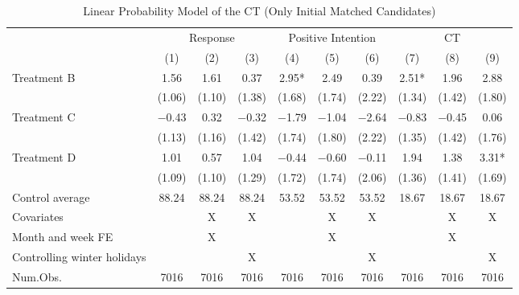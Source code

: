 \documentclass[12pt, a4paper]{article}
\begin{document}
\begin{table}[H]

\caption{\label{tab:lm-reply-test-initial-matched}Linear Probability Model of the CT (Only Initial Matched Candidates)}
\centering
\fontsize{8}{10}\selectfont
\begin{threeparttable}
\begin{tabular}[t]{lccccccccc}
\toprule
\multicolumn{1}{c}{ } & \multicolumn{3}{c}{Response} & \multicolumn{3}{c}{Positive Intention} & \multicolumn{3}{c}{CT} \\
\cmidrule(l{3pt}r{3pt}){2-4} \cmidrule(l{3pt}r{3pt}){5-7} \cmidrule(l{3pt}r{3pt}){8-10}
  & (1) & (2) & (3) & (4) & (5) & (6) & (7) & (8) & (9)\\
\midrule
Treatment B & \num{1.56} & \num{1.61} & \num{0.37} & \num{2.95}* & \num{2.49} & \num{0.39} & \num{2.51}* & \num{1.96} & \num{2.88}\\
 & (\num{1.06}) & (\num{1.10}) & (\num{1.38}) & (\num{1.68}) & (\num{1.74}) & (\num{2.22}) & (\num{1.34}) & (\num{1.42}) & (\num{1.80})\\
Treatment C & \num{-0.43} & \num{0.32} & \num{-0.32} & \num{-1.79} & \num{-1.04} & \num{-2.64} & \num{-0.83} & \num{-0.45} & \num{0.06}\\
 & (\num{1.13}) & (\num{1.16}) & (\num{1.42}) & (\num{1.74}) & (\num{1.80}) & (\num{2.22}) & (\num{1.35}) & (\num{1.42}) & (\num{1.76})\\
Treatment D & \num{1.01} & \num{0.57} & \num{1.04} & \num{-0.44} & \num{-0.60} & \num{-0.11} & \num{1.94} & \num{1.38} & \num{3.31}*\\
 & (\num{1.09}) & (\num{1.10}) & (\num{1.29}) & (\num{1.72}) & (\num{1.74}) & (\num{2.06}) & (\num{1.36}) & (\num{1.41}) & (\num{1.69})\\
\midrule
Control average & 88.24 & 88.24 & 88.24 & 53.52 & 53.52 & 53.52 & 18.67 & 18.67 & 18.67\\
Covariates &  & X & X &  & X & X &  & X & X\\
Month and week FE &  & X &  &  & X &  &  & X & \\
Controlling winter holidays &  &  & X &  &  & X &  &  & X\\
Num.Obs. & \num{7016} & \num{7016} & \num{7016} & \num{7016} & \num{7016} & \num{7016} & \num{7016} & \num{7016} & \num{7016}\\
\bottomrule
\end{tabular}
\begin{tablenotes}

\end{tablenotes}
\end{threeparttable}
\end{table}
\end{document}
